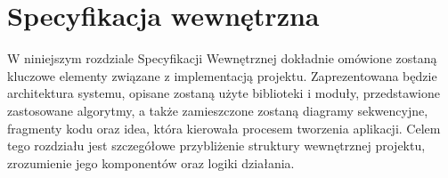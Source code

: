 \chapter{Specyfikacja wewnętrzna}
\label{ch:05}

W niniejszym rozdziale Specyfikacji Wewnętrznej dokładnie omówione zostaną kluczowe elementy związane z implementacją projektu. Zaprezentowana będzie architektura systemu, opisane zostaną użyte biblioteki i moduły, przedstawione zastosowane algorytmy, a także zamieszczone zostaną diagramy sekwencyjne, fragmenty kodu oraz idea, która kierowała procesem tworzenia aplikacji. Celem tego rozdziału jest szczegółowe przybliżenie struktury wewnętrznej projektu, zrozumienie jego komponentów oraz logiki działania.

